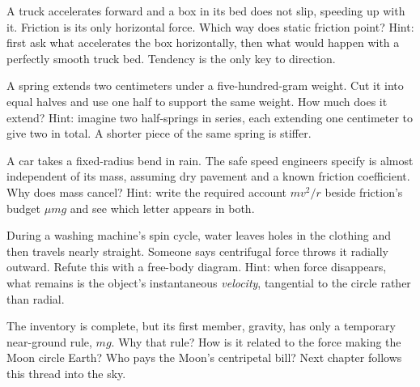 \begin{puzzles}
\item A truck accelerates forward and a box in its bed does not slip, speeding up with it. Friction is its only horizontal force. Which way does static friction point? Hint: first ask what accelerates the box horizontally, then what would happen with a perfectly smooth truck bed. Tendency is the only key to direction.

\item A spring extends two centimeters under a five-hundred-gram weight. Cut it into equal halves and use one half to support the same weight. How much does it extend? Hint: imagine two half-springs in series, each extending one centimeter to give two in total. A shorter piece of the same spring is stiffer.

\item A car takes a fixed-radius bend in rain. The safe speed engineers specify is almost independent of its mass, assuming dry pavement and a known friction coefficient. Why does mass cancel? Hint: write the required account \(mv^2/r\) beside friction's budget \(\mu mg\) and see which letter appears in both.

\item During a washing machine's spin cycle, water leaves holes in the clothing and then travels nearly straight. Someone says centrifugal force throws it radially outward. Refute this with a free-body diagram. Hint: when force disappears, what remains is the object's instantaneous \emph{velocity}, tangential to the circle rather than radial.
\end{puzzles}

The inventory is complete, but its first member, gravity, has only a temporary near-ground rule, \(mg\). Why that rule? How is it related to the force making the Moon circle Earth? Who pays the Moon's centripetal bill? Next chapter follows this thread into the sky.
